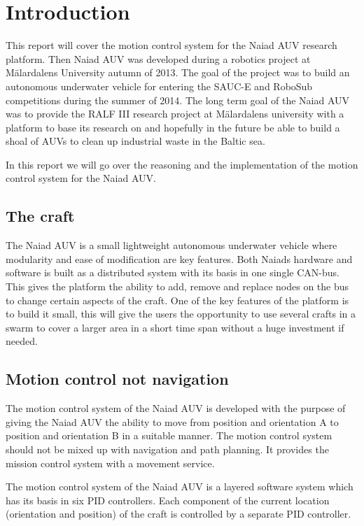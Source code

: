 \section{Introduction}\label{sec:introduction}

This report will cover the motion control system for the Naiad AUV research platform. Then Naiad AUV was developed during a robotics project at M\"alardalens University autumn of 2013. The goal of the project was to build an autonomous underwater vehicle for entering the SAUC-E and RoboSub competitions during the summer of 2014. The long term goal of the Naiad AUV was to provide the RALF III research project at M\"alardalens university with a platform to base its research on and hopefully in the future be able to build a shoal of AUVs to clean up industrial waste in the Baltic sea.

In this report we will go over the reasoning and the implementation of the motion control system for the Naiad AUV. 


\subsection{The craft}

The Naiad AUV is a small lightweight autonomous underwater vehicle where modularity and ease of modification are key features. Both Naiads hardware and software is built as a distributed system with its basis in one single CAN-bus. This gives the platform the ability to add, remove and replace nodes on the bus to change certain aspects of the craft. One of the key features of the platform is to build it small, this will give the users the opportunity to use several crafts in a swarm to cover a larger area in a short time span without a huge investment if needed.

\subsection{Motion control not navigation}

The motion control system of the Naiad AUV is developed with the purpose of giving the Naiad AUV the ability to move from position and orientation A to position and orientation B in a suitable manner. The motion control system should not be mixed up with navigation and path planning. It provides the mission control system with a movement service.

The motion control system of the Naiad AUV is a layered software system which has its basis in six PID controllers. Each component of the current location (orientation and position) of the craft is controlled by a separate PID controller. 

